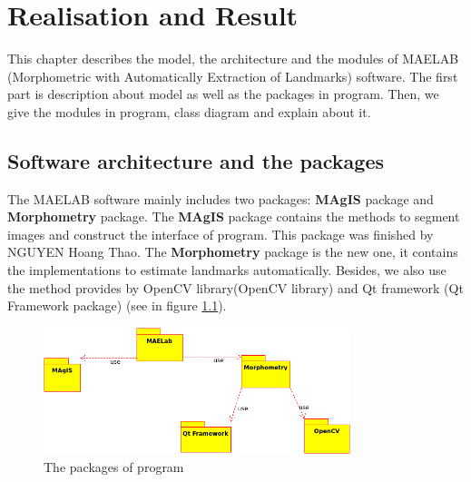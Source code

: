 \chapter{Realisation and Result}
This chapter describes the model, the architecture and the modules of MAELAB (Morphometric with Automatically Extraction of Landmarks) software. The first part is description about model as well as the packages in program. Then, we give the modules in program, class diagram and explain about it.
\section{Software architecture and the packages}
The MAELAB software mainly includes two packages: \textbf{MAgIS} package and \textbf{Morphometry} package. The \textbf{MAgIS} package contains the methods to segment images and construct the interface of program. This package was finished by NGUYEN Hoang Thao. The \textbf{Morphometry} package is the new one, it contains the implementations to estimate landmarks automatically. Besides, we also use the method provides by OpenCV library(OpenCV library) and Qt framework (Qt Framework package) (see in figure \ref{fig:42}).
\begin{figure}[h!]
\centering
\includegraphics[width=0.8\textwidth]{./images/packages}
\caption{The packages of program}
\label{fig:42}
\end{figure}~\\
